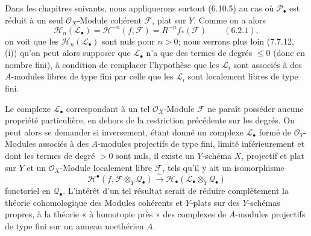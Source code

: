 \begin{remark}[6.10.6]
Dans les chapitres suivants, nous appliquerons surtout (6.10.5) au cas où
$\mathscr P_\bullet$ est réduit à un seul $\mathscr O_X$-Module cohérent
$\mathscr F$, plat sur $Y$. Comme on a alors
\[
  \mathscr H_n(\mathscr L_\bullet)
  =
  \mathscr H^{-n}(f,\mathscr F)
  =
  R^{-n}f_*(\mathscr F)
  \qquad(6.2.1),
\]
on voit que les $\mathscr H_n(\mathscr L_\bullet)$ sont nuls pour $n>0$;
nous verrons plus loin (7.7.12, (i)) qu'on peut alors supposer que
$\mathscr L_\bullet$ n'a que des termes de degrés $\leqslant0$ (donc en
nombre fini), à condition de remplacer l'hypothèse que les $\mathscr L_i$
sont associés à des $A$-modules libres de type fini par celle que les
$\mathscr L_i$ sont localement libres de type fini.

Le complexe $\mathscr L_\bullet$ correspondant à un tel
$\mathscr O_X$-Module $\mathscr F$ ne paraît posséder aucune
propriété particulière, en dehors de la restriction précédente sur les
degrés. On peut alors se demander si inversement, étant donné un complexe
$\mathscr L_\bullet$ formé de $\mathscr O_Y$-Modules associés à des
$A$-modules projectifs de type fini, limité inférieurement et dont les termes
de degré $>0$ sont nuls, il existe un $Y$-schéma $X$, projectif et plat sur
$Y$ et un $\mathscr O_X$-Module localement libre $\mathscr F$, tels qu'il y
ait un isomorphisme
\[
  \mathscr H^\bullet
  (f,\mathscr F\otimes_Y\mathscr Q_\bullet)
  \xrightarrow{\sim}
  \mathscr H_\bullet
  (\mathscr L_\bullet\otimes_Y\mathscr Q_\bullet)
\]
fonctoriel en $\mathscr Q_\bullet$. L'intérêt d'un tel résultat serait de
réduire complètement la théorie cohomologique des Modules cohérents et
$Y$-plats sur des $Y$-schémas propres, à la théorie « à homotopie près » des
complexes de $A$-modules projectifs de type fini sur un anneau noethérien
$A$.
\end{remark}
